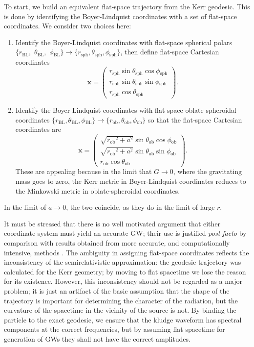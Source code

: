 \documentclass[useAMS,usedcolumn,usegraphicx,usenatbib]{mn2e}
\newcommand{\sub}[1]{\ensuremath{_\mathrm{#1}}}
\begin{document}
To start, we build an equivalent flat-space trajectory from the Kerr geodesic. This is done by identifying the Boyer-Lindquist coordinates with a set of flat-space coordinates. We consider two choices here:
\begin{enumerate}
\item Identify the Boyer-Lindquist coordinates with flat-space spherical polars $\{r\sub{BL},$ $\theta\sub{BL},$ $\phi\sub{BL}\} \rightarrow \{r\sub{sph}, \theta\sub{sph}, \phi\sub{sph}\}$, then define flat-space Cartesian coordinates \citep{Gair2005, Babak2007}
\begin{equation}
\boldsymbol{x} = \begin{pmatrix}
r\sub{sph} \sin\theta\sub{sph}\cos\phi\sub{sph} \\
r\sub{sph} \sin\theta\sub{sph}\sin\phi\sub{sph} \\
r\sub{sph} \cos\theta\sub{sph}
\end{pmatrix}.
\end{equation}
\item Identify the Boyer-Lindquist coordinates with flat-space oblate-spheroidal coordinates $\{r\sub{BL}, \theta\sub{BL}, \phi\sub{BL}\} \rightarrow \{r\sub{ob}, \theta\sub{ob}, \phi\sub{ob}\}$ so that the flat-space Cartesian coordinates are
\begin{equation}
\boldsymbol{x} = \begin{pmatrix}
\sqrt{{r\sub{ob}}^2 + a^2} \sin\theta\sub{ob}\cos\phi\sub{ob} \\
\sqrt{{r\sub{ob}}^2 + a^2} \sin\theta\sub{ob}\sin\phi\sub{ob} \\
r\sub{ob} \cos\theta\sub{ob}
\end{pmatrix}.
\end{equation}
These are appealing because in the limit that $G \rightarrow 0$, where the gravitating mass goes to zero, the Kerr metric in Boyer-Lindquist coordinates reduces to the Minkowski metric in oblate-spheroidal coordinates.
\end{enumerate}
In the limit of $a \rightarrow 0$, the two coincide, as they do in the limit of large $r$.

It must be stressed that there is no well motivated argument that either coordinate system must yield an accurate GW; their use is justified {\it post facto} by comparison with results obtained from more accurate, and computationally intensive, methods \citep{Gair2005, Babak2007}. The ambiguity in assigning flat-space coordinates reflects the inconsistency of the semirelativistic approximation: the geodesic trajectory was calculated for the Kerr geometry; by moving to flat spacetime we lose the reason for its existence. However, this inconsistency should not be regarded as a major problem; it is just an artifact of the basic assumption that the shape of the trajectory is important for determining the character of the radiation, but the curvature of the spacetime in the vicinity of the source is not. By binding the particle to the exact geodesic, we ensure that the kludge waveform has spectral components at the correct frequencies, but by assuming flat spacetime for generation of GWs they shall not have the correct amplitudes.
\end{document}
